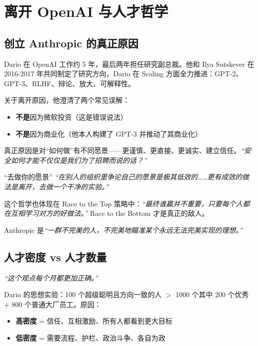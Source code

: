 \section{离开 OpenAI 与人才哲学}

\subsection{创立 Anthropic 的真正原因}

Dario 在 OpenAI 工作约 5 年，最后两年担任研究副总裁。他和 Ilya Sutskever 在 2016-2017 年共同制定了研究方向，Dario 在 Scaling 方面全力推进：GPT-2、GPT-3、RLHF、辩论、放大、可解释性。

关于离开原因，他澄清了两个常见误解：
\begin{itemize}
    \item \textbf{不是}因为微软投资（这是错误说法）
    \item \textbf{不是}因为商业化（他本人构建了 GPT-3 并推动了其商业化）
\end{itemize}

真正原因是对``如何做''有不同愿景——更谨慎、更直接、更诚实、建立信任。\textit{``安全如何才能不仅仅是我们为了招聘而说的话？''}

\begin{importantbox}{``去做你的愿景''}
\textit{``在别人的组织里争论自己的愿景是极其低效的……更有成效的做法是离开，去做一个干净的实验。''}

这个哲学也体现在 Race to the Top 策略中：\textit{``最终谁赢并不重要，只要每个人都在互相学习对方的好做法。''} Race to the Bottom 才是真正的敌人。

Anthropic 是\textit{``一群不完美的人，不完美地瞄准某个永远无法完美实现的理想。''}
\end{importantbox}

\subsection{人才密度 vs 人才数量}

\textit{``这个观点每个月都更加正确。''}

Dario 的思想实验：100 个超级聪明且方向一致的人 $>$ 1000 个其中 200 个优秀 + 800 个普通大厂员工。原因：

\begin{itemize}
    \item \textbf{高密度} = 信任、互相激励、所有人都看到更大目标
    \item \textbf{低密度} = 需要流程、护栏、政治斗争、各自为政
\end{itemize}

